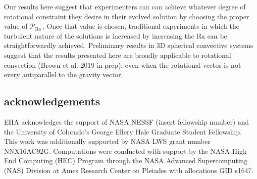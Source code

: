 \documentclass[twocolumn, amsmath, amsfonts, amssymb]{aastex62}
\newcommand{\pro}{\ensuremath{\mathcal{P}_{\text{Ro}}\,}}
\begin{document}
Our results here suggest that experimenters can
can achieve whatever degree of rotational constraint they desire in their evolved solution
by choosing the proper value of \pro. Once that value is chosen, traditional experiments
in which the turbulent nature of the solutions is increased by increasing the Ra can be 
straightforwardly achieved. Preliminary results in 3D spherical convective systems suggest
that the results presented here are broadly applicable to rotational convection 
(Brown et al. 2019 in prep), even when the rotational vector is not every antiparallel to the
gravity vector.


\subsection{acknowledgements}
EHA acknowledges the support of NASA NESSF (insert fellowship number)
and the University of Colorado's George 
Ellery Hale Graduate Student Fellowship.
This work was additionally supported by  NASA LWS grant number NNX16AC92G.  
Computations were conducted 
with support by the NASA High End Computing (HEC) Program through the NASA 
Advanced Supercomputing (NAS) Division at Ames Research Center on Pleiades
with allocations GID s1647.


\end{document}
